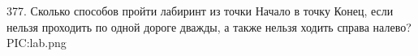 377. Сколько способов пройти лабиринт из точки Начало в точку Конец, если нельзя проходить по одной дороге
дважды, а также нельзя ходить справа налево?\\
{{PIC:lab.png}}\\
